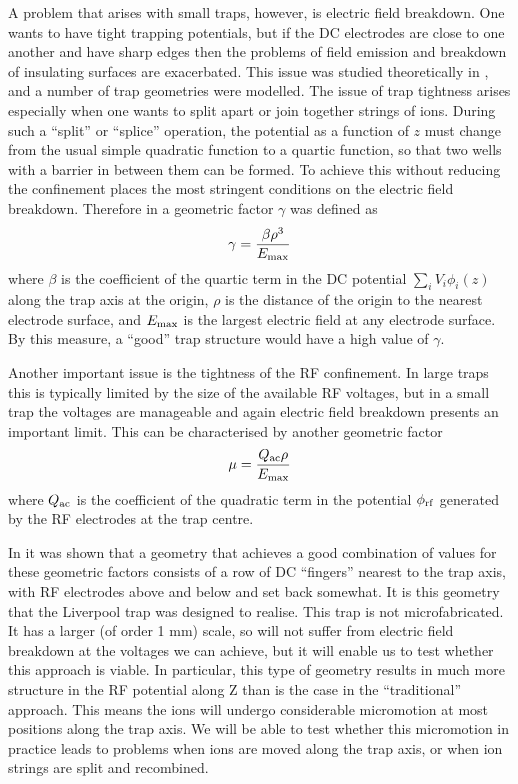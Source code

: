 A problem that arises with small traps, however, is electric field breakdown. One wants to have tight trapping potentials, but if the DC electrodes are close to one another and have sharp edges then the problems of field emission and breakdown of insulating surfaces are exacerbated. This issue was studied theoretically in \cite{Home2006a}, and a number of trap geometries were modelled. The issue of trap tightness arises especially when one wants to split apart or join together strings of ions. During such a ``split'' or ``splice'' operation, 
the potential as a function of $z$ must change from the usual simple quadratic function to a quartic function, so that two wells with a barrier in between them can be formed. To achieve this without reducing the confinement places 
the most stringent conditions on the electric field breakdown. Therefore in \cite{Home2006a} a geometric factor $\gamma$ was defined as
\begin{equation}
\gamma = \frac{\beta \rho^3}{E_{\rm max}}
\label{eq:gammadef}
\end{equation}
where $\beta$ is the coefficient of the quartic term in the DC potential $\sum_i V_i \phi_i(z)$ along the trap axis at the origin, $\rho$ is the distance of the origin to the nearest electrode surface, and $E_{\rm max}$ is the largest electric field at any electrode surface. By this measure, a ``good'' trap structure would have a high value of $\gamma$.

Another important issue is the tightness of the RF confinement. In large traps this is typically limited by the size of the available RF voltages, but  in a small trap the voltages are manageable and again electric field breakdown 
presents an important limit. This can be characterised by another geometric factor 
\begin{equation}
\mu = \frac{Q_{\rm ac} \rho}{E_{\rm max}}
\label{eq:mudef}
\end{equation}
where $Q_{\rm ac}$ is the coefficient of the quadratic term in the potential $\phi_{\rm rf}$ generated by the RF electrodes at the trap centre.

In \cite{Home2006a} it was shown that a geometry that achieves a good combination of values for these geometric factors consists of a row of DC ``fingers'' nearest to the trap axis, with RF electrodes above and below and set back somewhat. It is this geometry that the Liverpool trap was designed to realise. This trap is not microfabricated. It has a larger (of order 1 mm) scale, so will not suffer from electric field breakdown at the voltages we can achieve, but it will enable us to test whether this approach is viable. In particular, this type of geometry results in much more structure in the RF potential along Z than is the case in the ``traditional'' approach. This means the ions will undergo considerable micromotion at most positions along the trap axis. We will be able to test whether 
this micromotion in practice leads to problems when ions are moved along the trap axis, or when ion strings are split and recombined. 

